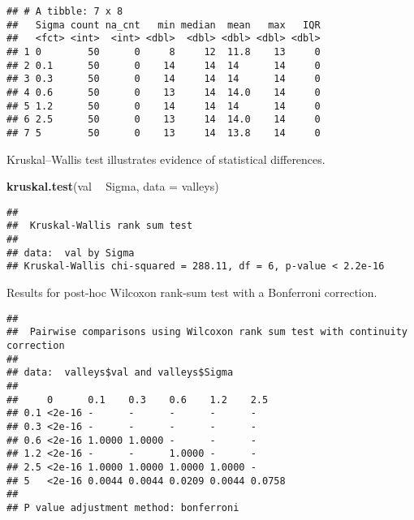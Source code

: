 \documentclass[]{book}
\newenvironment{Shaded}{\begin{snugshade}}{\end{snugshade}}
\newcommand{\DataTypeTok}[1]{\textcolor[rgb]{0.13,0.29,0.53}{#1}}
\newcommand{\KeywordTok}[1]{\textcolor[rgb]{0.13,0.29,0.53}{\textbf{#1}}}
\newcommand{\NormalTok}[1]{#1}
\newcommand{\OperatorTok}[1]{\textcolor[rgb]{0.81,0.36,0.00}{\textbf{#1}}}
\newcommand{\OtherTok}[1]{\textcolor[rgb]{0.56,0.35,0.01}{#1}}
\newcommand{\StringTok}[1]{\textcolor[rgb]{0.31,0.60,0.02}{#1}}
\begin{document}
\begin{verbatim}
## # A tibble: 7 x 8
##   Sigma count na_cnt   min median  mean   max   IQR
##   <fct> <int>  <int> <dbl>  <dbl> <dbl> <dbl> <dbl>
## 1 0        50      0     8     12  11.8    13     0
## 2 0.1      50      0    14     14  14      14     0
## 3 0.3      50      0    14     14  14      14     0
## 4 0.6      50      0    13     14  14.0    14     0
## 5 1.2      50      0    14     14  14      14     0
## 6 2.5      50      0    13     14  14.0    14     0
## 7 5        50      0    13     14  13.8    14     0
\end{verbatim}

Kruskal--Wallis test illustrates evidence of statistical differences.

\begin{Shaded}
\begin{Highlighting}[]
\KeywordTok{kruskal.test}\NormalTok{(val }\OperatorTok{~}\StringTok{ }\NormalTok{Sigma, }\DataTypeTok{data =}\NormalTok{ valleys)}
\end{Highlighting}
\end{Shaded}

\begin{verbatim}
## 
##  Kruskal-Wallis rank sum test
## 
## data:  val by Sigma
## Kruskal-Wallis chi-squared = 288.11, df = 6, p-value < 2.2e-16
\end{verbatim}

Results for post-hoc Wilcoxon rank-sum test with a Bonferroni correction.

\begin{Shaded}
\end{Shaded}

\begin{verbatim}
## 
##  Pairwise comparisons using Wilcoxon rank sum test with continuity correction 
## 
## data:  valleys$val and valleys$Sigma 
## 
##     0      0.1    0.3    0.6    1.2    2.5   
## 0.1 <2e-16 -      -      -      -      -     
## 0.3 <2e-16 -      -      -      -      -     
## 0.6 <2e-16 1.0000 1.0000 -      -      -     
## 1.2 <2e-16 -      -      1.0000 -      -     
## 2.5 <2e-16 1.0000 1.0000 1.0000 1.0000 -     
## 5   <2e-16 0.0044 0.0044 0.0209 0.0044 0.0758
## 
## P value adjustment method: bonferroni
\end{verbatim}
\end{document}
